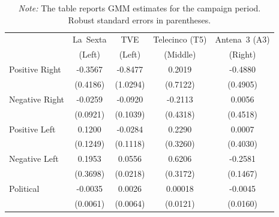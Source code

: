 \documentclass[12pt]{article}
\begin{document}
\begin{table}[!htbp]
	\caption{Estimated Cost Parameters ($\lambda$) by Channel and Content Type}
	\label{tab:costs}
	\centering\small
	\begin{tabular}{lcccc}
		\toprule
		& La~Sexta & TVE & Telecinco (T5) & Antena~3 (A3)\\
		& \scriptsize{(Left)} & \scriptsize{(Left)} & \scriptsize{(Middle)} & \scriptsize{(Right)}\\
		\midrule
		
		Positive Right 
		& -0.3567 & -0.8477 & 0.2019 & -0.4880 \\
		& (0.4186) & (1.0294) & (0.7122) & (0.4905) \\
		\midrule
		
		Negative Right
		& -0.0259 & -0.0920 & -0.2113 & 0.0056 \\
		& (0.0921) & (0.1039) & (0.4318) & (0.4518) \\
		\midrule
		
		Positive Left
		& 0.1200 & -0.0284 & 0.2290 & 0.0007 \\
		& (0.1249) & (0.1118) & (0.3260) & (0.4030) \\
		\midrule
		
		Negative Left
		& 0.1953 & 0.0556 & 0.6206 & -0.2581 \\
		& (0.3698) & (0.0218) & (0.3172) & (0.1467) \\
		\midrule
		
		Political
		& -0.0035 & 0.0026 & 0.00018 & -0.0045 \\
		& (0.0061) & (0.0064) & (0.0121) & (0.0160) \\
		\bottomrule
	\end{tabular}
	\vspace{0.5em}
	\caption*{\small \emph{Note:} The table reports GMM estimates for the campaign period. Robust standard errors in parentheses.}
\end{table}







\end{document}

